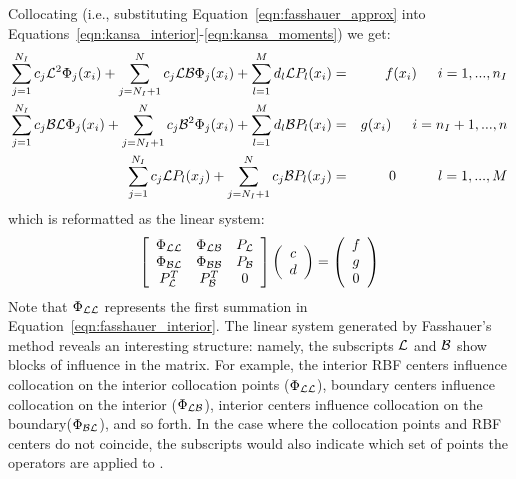 \documentclass{report}
\begin{document}
{Collocating (i.e., substituting Equation~\ref{eqn:fasshauer_approx} into Equations~\ref{eqn:kansa_interior}-\ref{eqn:kansa_moments}) we get: 
\begin{eqnarray}
\sum_{j=1}^{N_I}c_j\mathcal{L}^2{\Phi_j(x_i)} + \sum_{j=N_I+1}^{N}c_j\mathcal{L}\mathcal{B}\Phi_j(x_i) + \sum_{l=1}^{M}d_l \mathcal{L}P_l(x_i) &=&f(x_i)  \hskip1.5em i = 1,...,n_I  \label{eqn:fasshauer_interior} \\ 
\sum_{j=1}^{N_I}c_j\mathcal{B}\mathcal{L}\Phi_j(x_i) + \sum_{j=N_I+1}^{N}c_j\mathcal{B}^2{\Phi_j(x_i)} + \sum_{l=1}^{M}d_l \mathcal{B}P_l(x_i) &=& g(x_i)  \hskip1.5em i = n_I + 1,..., n \label{eqn:fasshauer_boundary} \\
\sum_{j=1}^{N_I} c_j \mathcal{L}P_l(x_j) + \sum_{j=N_I + 1}^{N} c_j \mathcal{B}P_l(x_j) &=& 0 \hskip3.0em l=1,...,M \label{eqn:fasshauer_moments} 
\end{eqnarray}
which is reformatted as the linear system: 
\begin{eqnarray}
\left[ \begin{array}{c c c} 
	\Phi_{\mathcal{L}\mathcal{L}} & \Phi_{\mathcal{L}\mathcal{B}} & P_{\mathcal{L}} \\
	\Phi_{\mathcal{B}\mathcal{L}} & \Phi_{\mathcal{B}\mathcal{B}} & P_{\mathcal{B}} \\
	P^T_{\mathcal{L}} & P^T_{\mathcal{B}} & 0 \\
	\end{array} \right] \left( \begin{array}{c}
							{c} \\
							{d}
							 \end{array}
						 \right) = \left( \begin{array}{c}
							{f} \\
							{g} \\
							0
							 \end{array}
						 \right) 
	\label{eqn:fasshauer_method}
\end{eqnarray}
Note that $\Phi_{\mathcal{L}\mathcal{L}}$ represents the first summation in Equation~\ref{eqn:fasshauer_interior}. The linear system generated by Fasshauer's method reveals an interesting structure: namely, the subscripts $\mathcal{L}$ and $\mathcal{B}$ show blocks of influence in the matrix. For example, the interior RBF centers influence collocation on the interior collocation points ($\Phi_{\mathcal{L}\mathcal{L}}$), boundary centers influence collocation on the interior ($\Phi_{\mathcal{L}\mathcal{B}}$), interior centers influence collocation on the boundary($\Phi_{\mathcal{B}\mathcal{L}}$), and so forth. In the case where the collocation points and RBF centers do not coincide, the subscripts would also indicate which set of points the operators are applied to \cite{Stevens:2009b}. 

}
\end{document}
